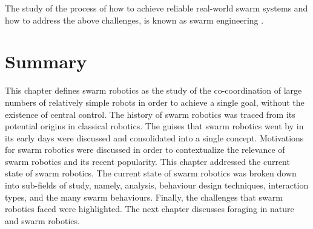 The study of the process of how to achieve reliable real-world swarm systems and how to address the above challenges, is known as swarm engineering \cite{brambilla2013swarm}. %

\section{Summary}
\label{sec:first:summary}

This chapter defines swarm robotics as the study of the co-coordination of large numbers of relatively simple robots in order to achieve a single goal, without the existence of central control. The history of swarm robotics was traced from its potential origins in classical robotics. The guises that swarm robotics went by in its early days were discussed and consolidated into a single concept. Motivations for swarm robotics were discussed in order to contextualize the relevance of swarm robotics and its recent popularity. This chapter addressed the current state of swarm robotics. The current state of swarm robotics was broken down into sub-fields of study, namely, analysis, behaviour design techniques, interaction types, and the many swarm behaviours. Finally, the challenges that swarm robotics faced were highlighted. The next chapter discusses foraging in nature and swarm robotics.